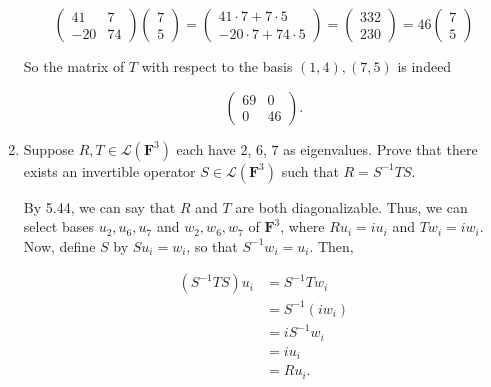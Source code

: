 \documentclass{book}
\begin{document}
\begin{enumerate}
\begin{equation*}
    \begin{pmatrix}
        41 & 7 \\
        -20 & 74
    \end{pmatrix}
    \begin{pmatrix}
        7 \\
        5
    \end{pmatrix}
    =
    \begin{pmatrix}
        41 \cdot 7 + 7 \cdot 5 \\
        -20 \cdot 7 + 74 \cdot 5
    \end{pmatrix}
    =
    \begin{pmatrix}
        332 \\
        230
    \end{pmatrix}
    =46
    \begin{pmatrix}
        7 \\
        5
    \end{pmatrix}    
\end{equation*}

So the matrix of \(T\) with respect to the basis \((1,4),(7,5)\) is indeed

\begin{equation*}
    \begin{pmatrix}
        69 & 0 \\
        0 & 46
    \end{pmatrix}.
\end{equation*}

\item Suppose \(R,T \in \mathcal{L}(\textbf{F}^3)\) each have \(2\), \(6\), \(7\) as eigenvalues.  Prove that there exists an invertible operator \(S \in \mathcal{L}(\textbf{F}^3)\) such that \(R=S^{-1}TS\).

By 5.44, we can say that \(R\) and \(T\) are both diagonalizable.  Thus, we can select bases \(u_2,u_6,u_7\) and \(w_2,w_6,w_7\) of \(\textbf{F}^3\), where \(Ru_i=iu_i\) and \(Tw_i=iw_i\).  Now, define \(S\) by \(Su_i=w_i\), so that \(S^{-1}w_i=u_i\).  Then,

\begin{equation*}
    \begin{split}
        (S^{-1}TS)u_i &= S^{-1}Tw_i \\
        &= S^{-1}(iw_i) \\
        &= iS^{-1}w_i \\
        &= iu_i \\
        &= Ru_i.
    \end{split}
\end{equation*}


\end{enumerate}
\end{document}
